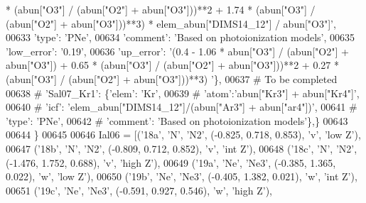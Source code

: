\begin{DoxyCode}
{       * (abun["O3"] / (abun["O2"] + abun["O3"]))**2 + 1.74 * (abun["O3"] / (abun["O2"] + abun["O3"]))**3) *
       elem\_abun["DIMS14\_12"] / abun["O3"]'},
00633                                        \textcolor{stringliteral}{'type'}: \textcolor{stringliteral}{'PNe'},
00634                                        \textcolor{stringliteral}{'comment'}: \textcolor{stringliteral}{'Based on photoionization models'},
00635                                        \textcolor{stringliteral}{'low\_error'}: \textcolor{stringliteral}{'0.19'},
00636                                        \textcolor{stringliteral}{'up\_error'}: \textcolor{stringliteral}{'(0.4 - 1.06 * abun["O3"] / (abun["O2"] + abun["O3"]) +
       0.65 * (abun["O3"] / (abun["O2"] + abun["O3"]))**2 + 0.27 * (abun["O3"] / (abun["O2"] + abun["O3"]))**3) '}\},
00637 \textcolor{comment}{# To be completed}
00638 \textcolor{comment}{#                         'Sal07\_Kr1': \{'elem': 'Kr',}
00639 \textcolor{comment}{#                                       'atom':'abun["Kr3"] + abun["Kr4"]', }
00640 \textcolor{comment}{#                                       'icf': 'elem\_abun["DIMS14\_12"]/(abun["Ar3"] + abun["ar4"])',}
00641 \textcolor{comment}{#                                       'type': 'PNe',}
00642 \textcolor{comment}{#                                       'comment': 'Based on photoionization models'\},\}}
00643                          
00644                          \}
00645         
00646         Ial06 = [(\textcolor{stringliteral}{'18a'}, \textcolor{stringliteral}{'N'}, \textcolor{stringliteral}{'N2'}, (-0.825, 0.718, 0.853), \textcolor{stringliteral}{'v'}, \textcolor{stringliteral}{'low Z'}),
00647                  (\textcolor{stringliteral}{'18b'}, \textcolor{stringliteral}{'N'}, \textcolor{stringliteral}{'N2'}, (-0.809, 0.712, 0.852), \textcolor{stringliteral}{'v'}, \textcolor{stringliteral}{'int Z'}),
00648                  (\textcolor{stringliteral}{'18c'}, \textcolor{stringliteral}{'N'}, \textcolor{stringliteral}{'N2'}, (-1.476, 1.752, 0.688), \textcolor{stringliteral}{'v'}, \textcolor{stringliteral}{'high Z'}),
00649                  (\textcolor{stringliteral}{'19a'}, \textcolor{stringliteral}{'Ne'}, \textcolor{stringliteral}{'Ne3'}, (-0.385, 1.365, 0.022), \textcolor{stringliteral}{'w'}, \textcolor{stringliteral}{'low Z'}),
00650                  (\textcolor{stringliteral}{'19b'}, \textcolor{stringliteral}{'Ne'}, \textcolor{stringliteral}{'Ne3'}, (-0.405, 1.382, 0.021), \textcolor{stringliteral}{'w'}, \textcolor{stringliteral}{'int Z'}),
00651                  (\textcolor{stringliteral}{'19c'}, \textcolor{stringliteral}{'Ne'}, \textcolor{stringliteral}{'Ne3'}, (-0.591, 0.927, 0.546), \textcolor{stringliteral}{'w'}, \textcolor{stringliteral}{'high Z'}),

\end{DoxyCode}
